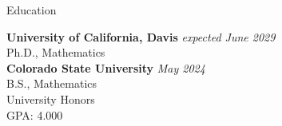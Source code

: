 \documentclass[
	11pt, %
]{resume} %
\begin{document}

%





\begin{rSection}{Education}

	\textbf{University of California, Davis} \hfill \textit{expected June 2029} \\ 
	Ph.D., Mathematics \\
	



	\textbf{Colorado State University} \hfill \textit{May 2024} \\ 
	B.S., Mathematics \\
	University Honors \\
	GPA: 4.000 \\
	
\end{rSection}
\end{document}
